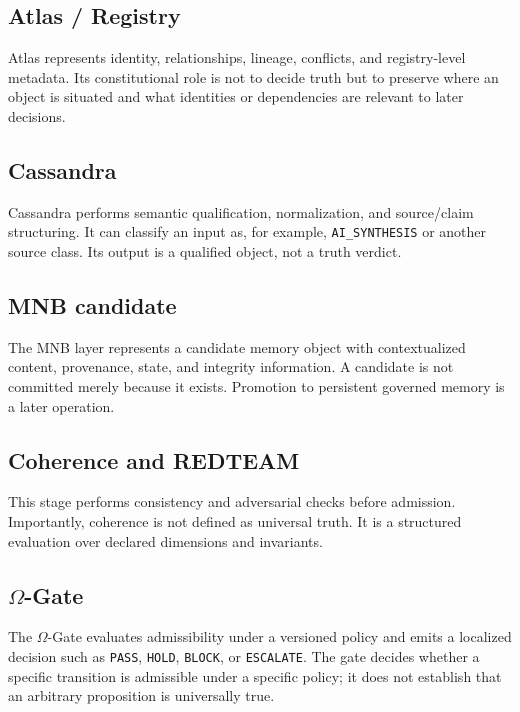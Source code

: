 \documentclass[11pt]{article}
\begin{document}
\subsection{Atlas / Registry}

Atlas represents identity, relationships, lineage, conflicts, and registry-level metadata. Its constitutional role is not to decide truth but to preserve where an object is situated and what identities or dependencies are relevant to later decisions.

\subsection{Cassandra}

Cassandra performs semantic qualification, normalization, and source/claim structuring. It can classify an input as, for example, \texttt{AI\_SYNTHESIS} or another source class. Its output is a qualified object, not a truth verdict.

\subsection{MNB candidate}

The MNB layer represents a candidate memory object with contextualized content, provenance, state, and integrity information. A candidate is not committed merely because it exists. Promotion to persistent governed memory is a later operation.

\subsection{Coherence and REDTEAM}

This stage performs consistency and adversarial checks before admission. Importantly, coherence is not defined as universal truth. It is a structured evaluation over declared dimensions and invariants.

\subsection{$\Omega$-Gate}

The $\Omega$-Gate evaluates admissibility under a versioned policy and emits a localized decision such as \texttt{PASS}, \texttt{HOLD}, \texttt{BLOCK}, or \texttt{ESCALATE}. The gate decides whether a specific transition is admissible under a specific policy; it does not establish that an arbitrary proposition is universally true.
\end{document}
